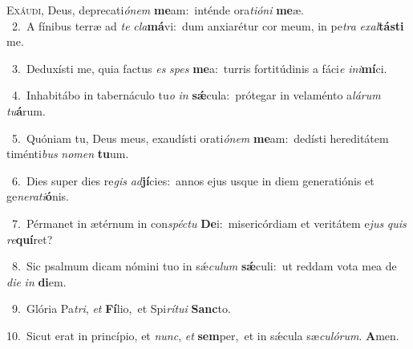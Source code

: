 \lettrine{\initial\textcolor{\initialcolor}{E}}{xáudi,} Deus, deprecati\-\textit{ó}\-\textit{nem} \textbf{me}\-am:~\star inténde ora\-\textit{ti}\-\textit{ó}\textit{ni} \textbf{me}\-æ.\\
{\numbfont\textcolor{\numbcolor}{~2.}}~A fínibus terræ ad \textit{te} \textit{cla}\-\textbf{má}vi:~\star dum anxiarétur cor meum, in pe\textit{tra} \textit{ex}\-\textit{al}\textbf{tás}\textbf{ti} me.\par
{\numbfont\textcolor{\numbcolor}{~3.}}~Deduxísti me, quia factus \textit{es} \textit{spes} \textbf{me}\-a:~\star turris fortitúdinis a fáci\textit{e} \textit{in}\-\textit{i}\textbf{mí}ci.\par
{\numbfont\textcolor{\numbcolor}{~4.}}~Inhabitábo in tabernáculo tu\textit{o} \textit{in} \textbf{sǽ}\-cula:~\star prótegar in velaménto a\-\textit{lá}\-\textit{rum} \textit{tu}\-\textbf{á}rum.\par
{\numbfont\textcolor{\numbcolor}{~5.}}~Quóniam tu, Deus meus, exaudísti orati\-\textit{ó}\-\textit{nem} \textbf{me}\-am:~\star dedísti hereditátem timénti\textit{bus} \textit{no}\-\textit{men} \textbf{tu}\-um.\par
{\numbfont\textcolor{\numbcolor}{~6.}}~Dies super dies re\textit{gis} \textit{ad}\-\textbf{jí}cies:~\star annos ejus usque in diem generatiónis et ge\-\textit{ne}\-\textit{ra}\textit{ti}\textbf{ó}nis.\par
{\numbfont\textcolor{\numbcolor}{~7.}}~Pérmanet in ætérnum in con\-\textit{spéc}\-\textit{tu} \textbf{De}\-i:~\star misericórdiam et veritátem e\textit{jus} \textit{quis} \textit{re}\-\textbf{quí}ret?\par
{\numbfont\textcolor{\numbcolor}{~8.}}~Sic psalmum dicam nómini tuo in sǽ\-\textit{cu}\-\textit{lum} \textbf{sǽ}\-culi:~\star ut reddam vota mea de \textit{di}\-\textit{e} \textit{in} \textbf{di}\-em.\par
{\numbfont\textcolor{\numbcolor}{~9.}}~Glória Pa\-\textit{tri}\-, \textit{et} \textbf{Fí}\-lio,~\star et Spi\-\textit{rí}\-\textit{tu}\textit{i} \textbf{Sanc}\-to.\par
{\numbfont\textcolor{\numbcolor}{10.}}~Sicut erat in princípio, et \textit{nunc}\-, \textit{et} \textbf{sem}\-per,~\star et in sǽcula sæ\-\textit{cu}\-\textit{ló}\textit{rum}. \textbf{A}\-men.\par
